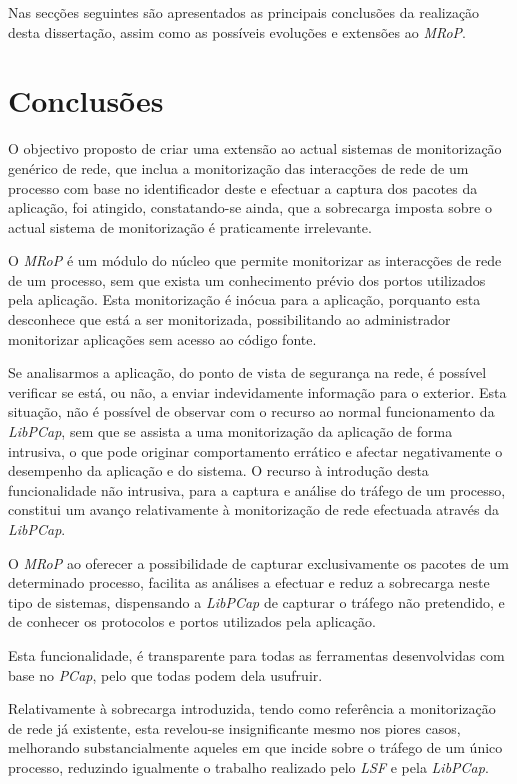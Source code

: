 Nas secções seguintes são apresentados as principais conclusões da realização desta dissertação, assim como as possíveis evoluções e extensões ao \textit{MRoP}.

\section{Conclusões}
\label{sec:conclusoes}

O objectivo proposto de criar uma extensão ao actual sistemas de monitorização genérico de rede, que inclua a monitorização das interacções de rede de um processo com base no identificador deste e efectuar a captura dos pacotes da aplicação, foi atingido, constatando-se ainda, que a sobrecarga imposta sobre o actual sistema de monitorização é praticamente irrelevante.

O \textit{MRoP} é um módulo do núcleo que permite monitorizar as interacções de rede de um processo, sem que exista um conhecimento prévio dos portos utilizados pela aplicação.
Esta monitorização é inócua para a aplicação, porquanto esta desconhece que está a ser monitorizada, possibilitando ao administrador monitorizar aplicações sem acesso ao código fonte.

Se analisarmos a aplicação, do ponto de vista de segurança na rede, é possível verificar se está, ou não, a enviar indevidamente informação para o exterior.
Esta situação, não é possível de observar com o recurso ao normal funcionamento da \textit{LibPCap}, sem que se assista a uma monitorização da aplicação de forma intrusiva, o que pode originar comportamento errático e afectar negativamente o desempenho da aplicação e do sistema.
O recurso à introdução desta funcionalidade não intrusiva, para a captura e análise do tráfego de um processo, constitui um avanço relativamente à monitorização de rede efectuada através da \textit{LibPCap}.

O \textit{MRoP} ao oferecer a possibilidade de capturar exclusivamente os pacotes de um determinado processo, facilita as análises a efectuar e reduz a sobrecarga neste tipo de sistemas, dispensando a \textit{LibPCap} de capturar o tráfego não pretendido, e de conhecer os protocolos e portos utilizados pela aplicação.

Esta funcionalidade, é transparente para todas as ferramentas desenvolvidas com base no \textit{PCap}, pelo que todas podem dela usufruir.

Relativamente à sobrecarga introduzida, tendo como referência a monitorização de rede já existente, esta revelou-se insignificante mesmo nos piores casos, melhorando substancialmente aqueles em que incide sobre o tráfego de um único processo, reduzindo igualmente o trabalho realizado pelo \textit{LSF} e pela \textit{LibPCap}.


